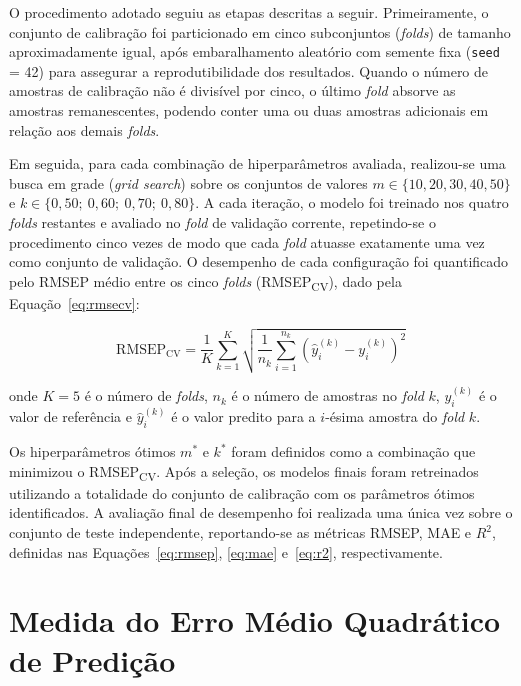 O procedimento adotado seguiu as etapas descritas a seguir. 
Primeiramente, o conjunto de calibração foi particionado em cinco 
subconjuntos (\textit{folds}) de tamanho aproximadamente igual, 
após embaralhamento aleatório com semente fixa (\texttt{seed} = 42) 
para assegurar a reprodutibilidade dos resultados. Quando o número 
de amostras de calibração não é divisível por cinco, o último 
\textit{fold} absorve as amostras remanescentes, podendo conter uma 
ou duas amostras adicionais em relação aos demais \textit{folds}.

Em seguida, para cada combinação de hiperparâmetros avaliada, 
realizou-se uma busca em grade (\textit{grid search}) sobre os 
conjuntos de valores $m \in \{10, 20, 30, 40, 50\}$ e 
$k \in \{0{,}50;\ 0{,}60;\ 0{,}70;\ 0{,}80\}$. A cada iteração, 
o modelo foi treinado nos quatro \textit{folds} restantes e avaliado 
no \textit{fold} de validação corrente, repetindo-se o procedimento 
cinco vezes de modo que cada \textit{fold} atuasse exatamente uma vez 
como conjunto de validação. O desempenho de cada configuração foi quantificado pelo RMSEP médio entre os cinco \textit{folds} (RMSEP\textsubscript{CV}), dado pela Equação~\ref{eq:rmsecv}:

\begin{equation}
\label{eq:rmsecv}
\text{RMSEP}_{\text{CV}} = \frac{1}{K} \sum_{k=1}^{K}
\sqrt{\frac{1}{n_k} \sum_{i=1}^{n_k}
\left(\hat{y}_i^{(k)} - y_i^{(k)}\right)^2}
\end{equation}

\noindent onde $K = 5$ é o número de \textit{folds}, $n_k$ é o número 
de amostras no \textit{fold} $k$, $y_i^{(k)}$ é o valor de referência 
e $\hat{y}_i^{(k)}$ é o valor predito para a $i$-ésima amostra do 
\textit{fold} $k$.

Os hiperparâmetros ótimos $m^*$ e $k^*$ foram definidos como a 
combinação que minimizou o RMSEP\textsubscript{CV}. Após a seleção, 
os modelos finais foram retreinados utilizando a totalidade do 
conjunto de calibração com os parâmetros ótimos identificados. 
A avaliação final de desempenho foi realizada uma única vez sobre 
o conjunto de teste independente, reportando-se as métricas RMSEP, 
MAE e $R^2$, definidas nas Equações~\ref{eq:rmsep}, \ref{eq:mae} 
e~\ref{eq:r2}, respectivamente.


\section{Medida do Erro Médio Quadrático de Predição}
\label{sec:mederropre}



